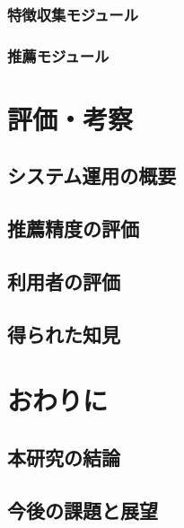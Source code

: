 \documentclass{jsarticle}
\begin{document}
\subsubsection{特徴収集モジュール}
\subsubsection{推薦モジュール}

\section{評価・考察}
\subsection{システム運用の概要}
\subsection{推薦精度の評価}
\subsection{利用者の評価}
\subsection{得られた知見}

\section{おわりに}
\subsection{本研究の結論}
\subsection{今後の課題と展望}

\newpage

\end{document}
